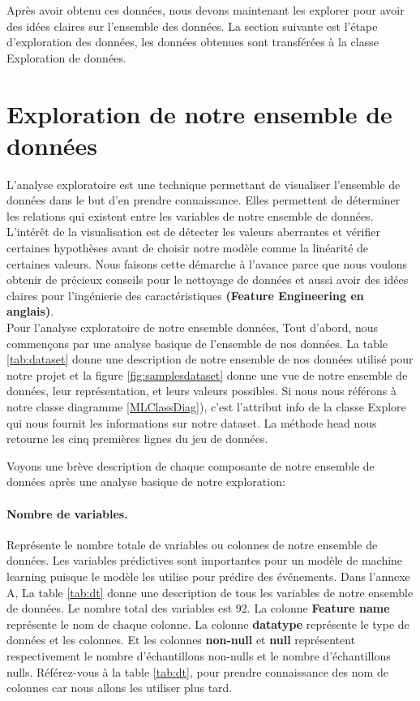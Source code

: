 \documentclass[12pt, french]{report}
\begin{document}
Après avoir obtenu ces données, nous devons maintenant les explorer pour avoir des idées claires sur l'ensemble des données. La section suivante est l'étape d'exploration des données, les données obtenues sont transférées à la classe Exploration de données. 

\section{Exploration de notre ensemble de données}

L'analyse exploratoire est une technique permettant de visualiser l'ensemble de données dans le but d'en prendre connaissance. Elles permettent de déterminer les relations qui existent entre les variables de notre ensemble de données.  L'intérêt de la visualisation est de détecter les valeurs aberrantes et vérifier certaines hypothèses avant de choisir notre modèle comme la linéarité de certaines valeurs. Nous faisons cette démarche à l'avance parce que nous voulons obtenir de précieux conseils pour le nettoyage de données et aussi avoir des idées claires pour l'ingénierie des caractéristiques \textbf{(Feature Engineering en anglais)}.  \\

Pour l'analyse exploratoire de notre ensemble données, Tout d'abord, nous commençons par une analyse basique de l'ensemble de nos données. La table \ref{tab:dataset} donne une description de notre ensemble de nos données utilisé pour notre projet et la figure \ref{fig:samplesdataset} donne une vue de notre ensemble de données, leur représentation, et leurs valeurs possibles. Si nous nous référons à notre classe diagramme \ref{MLClassDiag}), c'est l'attribut info de la classe Explore qui nous fournit les informations sur notre dataset. La méthode head nous retourne les cinq premières lignes du jeu de données.

Voyons une brève description de chaque composante de notre ensemble de données après une analyse basique de notre exploration:

\paragraph*{Nombre de variables.} Représente le nombre totale de variables ou colonnes de notre ensemble de données. Les variables prédictives sont importantes pour un modèle de machine learning puisque le modèle les utilise pour prédire des événements. Dans l'annexe A, La table \ref{tab:dt} donne une description de tous les variables de notre ensemble de données. Le nombre total des variables est 92.  La colonne \textbf{Feature name} représente le nom de chaque colonne. La colonne \textbf{datatype} représente le type de données et les colonnes. Et les colonnes \textbf{non-null} et \textbf{null} représentent respectivement le nombre d'échantillons non-nulls et le nombre d'échantillons nulls. Référez-vous à la table \ref{tab:dt}, pour prendre connaissance des nom de colonnes car nous allons les utiliser plus tard. 
\end{document}
